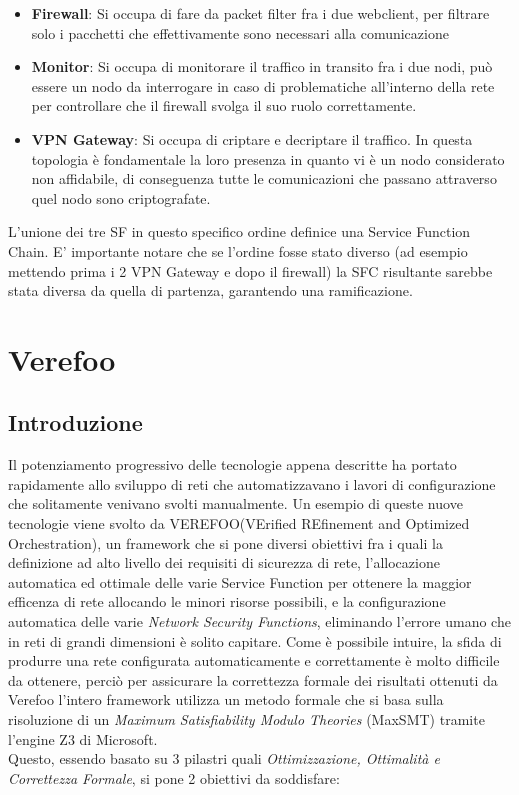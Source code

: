 \begin{itemize}
    \item \textbf{Firewall}: Si occupa di fare da packet filter fra i due webclient, per filtrare solo i pacchetti che effettivamente sono necessari alla comunicazione
    \item \textbf{Monitor}: Si occupa di monitorare il traffico in transito fra i due nodi, può essere un nodo da interrogare in caso di problematiche all'interno della rete per controllare che il firewall svolga il suo ruolo correttamente.
    \item \textbf{VPN Gateway}: Si occupa di criptare e decriptare il traffico. In questa topologia è fondamentale la loro presenza in quanto vi è un nodo considerato non affidabile, di conseguenza tutte le comunicazioni che passano attraverso quel nodo sono criptografate.
\end{itemize}

L'unione dei tre SF in questo specifico ordine definice una Service Function Chain. E' importante notare che se l'ordine fosse stato diverso (ad esempio mettendo prima i 2 VPN Gateway e dopo il firewall)
la SFC risultante sarebbe stata diversa da quella di partenza, garantendo una ramificazione.

\section{Verefoo}
\subsection{Introduzione}
 Il potenziamento progressivo delle tecnologie appena descritte ha portato rapidamente allo sviluppo di reti  che automatizzavano i lavori di configurazione che solitamente venivano svolti manualmente.
 Un esempio di queste nuove tecnologie viene svolto da VEREFOO\cite{Bringhenti2019}(VErified REfinement and Optimized Orchestration), un framework che si pone diversi obiettivi fra i quali la definizione
ad alto livello dei requisiti di sicurezza di rete, l'allocazione automatica ed ottimale delle varie Service Function per ottenere la maggior efficenza di rete allocando le minori risorse possibili, e la
configurazione automatica delle varie \textit{Network Security Functions}, eliminando l'errore  umano che in reti di grandi dimensioni è solito capitare.
Come è possibile intuire, la sfida di produrre una rete configurata automaticamente e correttamente è molto difficile da ottenere, perciò per assicurare la correttezza formale dei risultati ottenuti da Verefoo
l'intero framework utilizza un metodo formale che si basa sulla risoluzione di un \textit{Maximum Satisfiability Modulo Theories} (MaxSMT) tramite l'engine Z3 di Microsoft.\\
Questo, essendo basato su 3 pilastri quali \textit{Ottimizzazione, Ottimalità e Correttezza Formale}, si pone 2 obiettivi da soddisfare:

